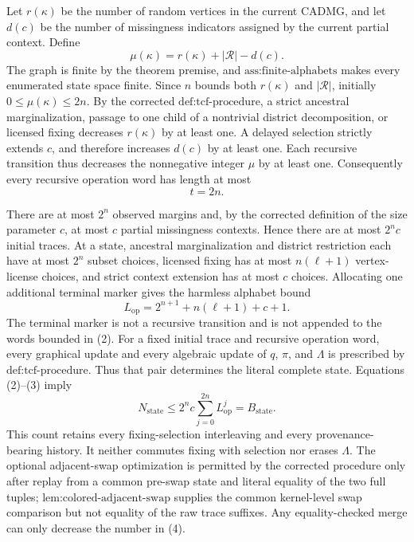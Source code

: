 Let \(r(\kappa)\) be the number of random vertices in the current CADMG, and let \(d(c)\) be the number of missingness indicators assigned by the current partial context. Define
\[
\mu(\kappa)=r(\kappa)+|\mathcal R|-d(c).
\tag{1}
\]
The graph is finite by the theorem premise, and \(\text{ass:finite-alphabets}\) makes every enumerated state space finite. Since \(n\) bounds both \(r(\kappa)\) and \(|\mathcal R|\), initially \(0\leq\mu(\kappa)\leq2n\). By the corrected \(\text{def:tcf-procedure}\), a strict ancestral marginalization, passage to one child of a nontrivial district decomposition, or licensed fixing decreases \(r(\kappa)\) by at least one. A delayed selection strictly extends \(c\), and therefore increases \(d(c)\) by at least one. Each recursive transition thus decreases the nonnegative integer \(\mu\) by at least one. Consequently every recursive operation word has length at most
\[
t=2n.
\tag{2}
\]

There are at most \(2^n\) observed margins and, by the corrected definition of the size parameter \(c\), at most \(c\) partial missingness contexts. Hence there are at most \(2^n c\) initial traces. At a state, ancestral marginalization and district restriction each have at most \(2^n\) subset choices, licensed fixing has at most \(n(\ell+1)\) vertex-license choices, and strict context extension has at most \(c\) choices. Allocating one additional terminal marker gives the harmless alphabet bound
\[
L_{\mathrm{op}}=2^{n+1}+n(\ell+1)+c+1.
\tag{3}
\]
The terminal marker is not a recursive transition and is not appended to the words bounded in (2). For a fixed initial trace and recursive operation word, every graphical update and every algebraic update of \(q\), \(\pi\), and \(\Lambda\) is prescribed by \(\text{def:tcf-procedure}\). Thus that pair determines the literal complete state. Equations (2)--(3) imply
\[
N_{\mathrm{state}}
\leq 2^n c\sum_{j=0}^{2n}L_{\mathrm{op}}^j
=B_{\mathrm{state}}.
\tag{4}
\]
This count retains every fixing-selection interleaving and every provenance-bearing history. It neither commutes fixing with selection nor erases \(\Lambda\). The optional adjacent-swap optimization is permitted by the corrected procedure only after replay from a common pre-swap state and literal equality of the two full tuples; \(\text{lem:colored-adjacent-swap}\) supplies the common kernel-level swap comparison but not equality of the raw trace suffixes. Any equality-checked merge can only decrease the number in (4).

